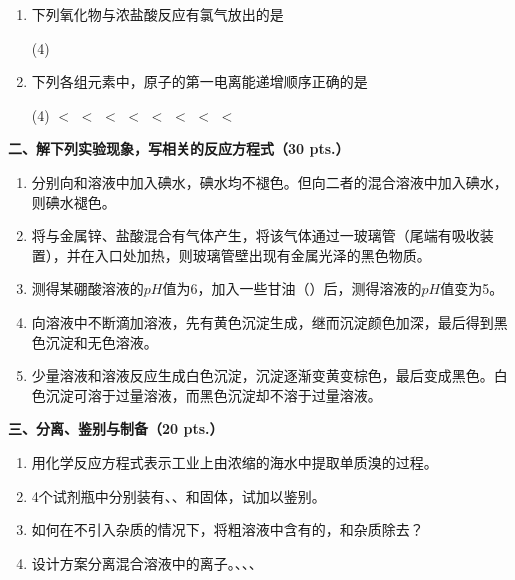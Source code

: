 \begin{enumerate}[label=\arabic*., itemsep=1.5ex]
\begin{tasks}
        \task {}溶液
        \task {}
    \end{tasks}
    \item 下列氧化物与浓盐酸反应有氯气放出的是
    \begin{tasks}(4)
        \task {}
        \task {}
        \task {}
        \task {}
    \end{tasks}
    \item 下列各组元素中，原子的第一电离能递增顺序正确的是
    \begin{tasks}(4)
        \task {} $<$  $<$ 
        \task {} $<$  $<$ 
        \task {} $<$  $<$ 
        \task {} $<$  $<$ 
    \end{tasks}
\end{enumerate}

\vspace{0.5cm}
\noindent\textbf{二、解下列实验现象，写相关的反应方程式（30 pts.）}

\begin{enumerate}[label=\arabic*., start=1, itemsep=1.5ex]
    \item 分别向和溶液中加入碘水，碘水均不褪色。但向二者的混合溶液中加入碘水，则碘水褪色。
    \item 将与金属锌、盐酸混合有气体产生，将该气体通过一玻璃管（尾端有吸收装置），并在入口处加热，则玻璃管壁出现有金属光泽的黑色物质。
    \item 测得某硼酸溶液的$pH$值为6，加入一些甘油（）后，测得溶液的$pH$值变为5。
    \item 向溶液中不断滴加溶液，先有黄色沉淀生成，继而沉淀颜色加深，最后得到黑色沉淀和无色溶液。
    \item 少量溶液和溶液反应生成白色沉淀，沉淀逐渐变黄变棕色，最后变成黑色。白色沉淀可溶于过量溶液，而黑色沉淀却不溶于过量溶液。
\end{enumerate}

\vspace{0.5cm}
\noindent\textbf{三、分离、鉴别与制备（20 pts.）}

\begin{enumerate}[label=\arabic*., start=1, itemsep=1.5ex]
    \item 用化学反应方程式表示工业上由浓缩的海水中提取单质溴的过程。
    \item 4个试剂瓶中分别装有、、和固体，试加以鉴别。
    \item 如何在不引入杂质的情况下，将粗溶液中含有的，和杂质除去？
    \item 设计方案分离混合溶液中的离子。、、、
\end{enumerate}

